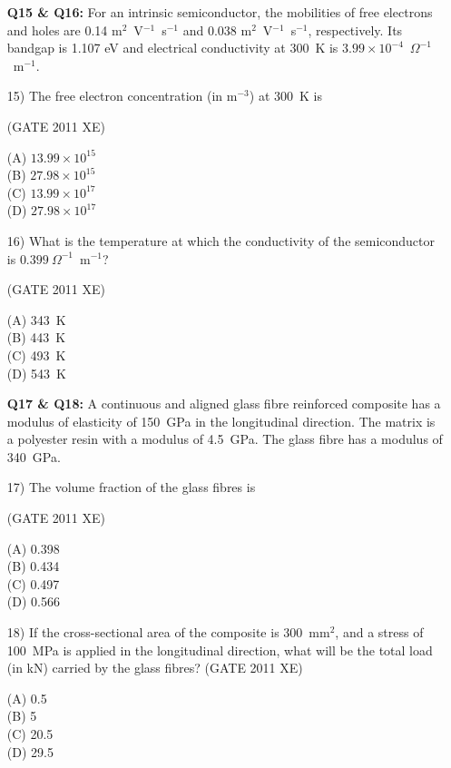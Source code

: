 \documentclass[journal,12pt,onecolumn]{IEEEtran}
\begin{document}
\begin{enumerate}
\begin{enumerate}
\begin{enumerate}
\item[\textbf{Q15 \& Q16:}] For an intrinsic semiconductor, the mobilities of free electrons and holes are 0.14 m$^2$~V$^{-1}$~s$^{-1}$ and 0.038 m$^2$~V$^{-1}$~s$^{-1}$, respectively. Its bandgap is 1.107 eV and electrical conductivity at 300~K is $3.99 \times 10^{-4}$~$\Omega^{-1}$~m$^{-1}$.


\item[15)] The free electron concentration (in m$^{-3}$) at 300~K is

\hfill{(GATE 2011 XE)}\\
\begin{multicols}{4}
(A) $13.99 \times 10^{15}$ \\
(B) $27.98 \times 10^{15}$ \\
(C) $13.99 \times 10^{17}$ \\
(D) $27.98 \times 10^{17}$
\end{multicols}

\item[16)] What is the temperature at which the conductivity of the semiconductor is $0.399~\Omega^{-1}$~m$^{-1}$?

\hfill{(GATE 2011 XE)}\\
\begin{multicols}{4}
(A) 343~K \\
(B) 443~K \\
(C) 493~K \\
(D) 543~K
\end{multicols}

\item[\textbf{Q17 \& Q18:}] A continuous and aligned glass fibre reinforced composite has a modulus of elasticity of 150~GPa in the longitudinal direction. The matrix is a polyester resin with a modulus of 4.5~GPa. The glass fibre has a modulus of 340~GPa.\\


\item[17)] The volume fraction of the glass fibres is

\hfill{(GATE 2011 XE)}\\
\begin{multicols}{4}
(A) 0.398 \\
(B) 0.434 \\
(C) 0.497 \\
(D) 0.566
\end{multicols}

\item[18)] If the cross-sectional area of the composite is 300~mm$^2$, and a stress of 100~MPa is applied in the longitudinal direction, what will be the total load (in kN) carried by the glass fibres?
\hfill{(GATE 2011 XE)}\\
\begin{multicols}{4}
(A) 0.5 \\
(B) 5 \\
(C) 20.5 \\
(D) 29.5
\end{multicols}


\end{enumerate}
\end{enumerate}
\end{enumerate}
\end{document}
